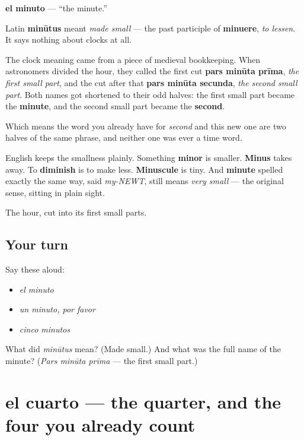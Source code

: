 \begin{cousinweb}
\textbf{el minuto} — \textquotedblleft{}the minute.\textquotedblright{}

Latin \textbf{minūtus} meant \emph{made small} — the past participle of \textbf{minuere}, \emph{to lessen}. It says nothing about clocks at all.

The clock meaning came from a piece of medieval bookkeeping. When astronomers divided the hour, they called the first cut \textbf{pars minūta prīma}, \emph{the first small part}, and the cut after that \textbf{pars minūta secunda}, \emph{the second small part}. Both names got shortened to their odd halves: the first small part became the \textbf{minute}, and the second small part became the \textbf{second}.

Which means the word you already have for \emph{second} and this new one are two halves of the same phrase, and neither one was ever a time word.

English keeps the smallness plainly. Something \textbf{minor} is smaller. \textbf{Minus} takes away. To \textbf{diminish} is to make less. \textbf{Minuscule} is tiny. And \textbf{minute} spelled exactly the same way, said \emph{my-NEWT}, still means \emph{very small} — the original sense, sitting in plain sight.
\end{cousinweb}

\begin{grammarlens}[title={What you've built}]
The hour, cut into its first small parts.
\end{grammarlens}

\subsection*{Your turn}
Say these aloud:

\begin{itemize}
\raggedright
  \item \emph{el minuto}
  \item \emph{un minuto, por favor}
  \item \emph{cinco minutos}
\end{itemize}

\begin{tcolorbox}[breakable,colback=teal!4,colframe=teal!35!black,title={Before you move on}]
What did \emph{minūtus} mean? (Made small.) And what was the full name of the minute? (\emph{Pars minūta prīma} — the first small part.)
\end{tcolorbox}
\section[el cuarto]{el cuarto — the quarter, and the four you already count}


